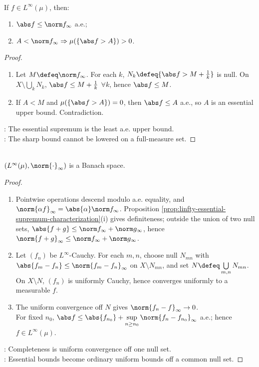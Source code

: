 \begin{proposition} \label{prop:linfty-essential-supremum-characterization} \\
If $f\in L^\infty(\mu)$, then:
\begin{enumerate}[label=(\roman*)]
\setlength{\itemsep}{0pt}
\item $\abs f\leq\norm f_\infty$ a.e.;
\item $A<\norm f_\infty\Rightarrow\mu(\{\abs f>A\})>0$.
\end{enumerate}
\begin{proof}
\begin{enumerate}[label=(\roman*)]
\setlength{\itemsep}{0pt}
\item Let $M\defeq\norm f_\infty$. For each $k$, $N_k\defeq\{\abs f>M+\frac{1}{k}\}$ is null. On $X\setminus\bigcup_kN_k$, $\abs f\leq M+\frac{1}{k}$ $\forall k$, hence $\abs f\leq M$.
\item If $A<M$ and $\mu(\{\abs f>A\})=0$, then $\abs f\leq A$ a.e., so $A$ is an essential upper bound. Contradiction.
\end{enumerate}
: The essential supremum is the least a.e. upper bound.\\
: The sharp bound cannot be lowered on a full-measure set.
\end{proof}
\end{proposition}

\begin{theorem} \label{thm:linfty-banach-space} \\
$(L^\infty(\mu),\norm{\cdot}_\infty)$ is a Banach space.
\begin{proof}
\begin{enumerate}[label=(\roman*)]
\setlength{\itemsep}{0pt}
\item Pointwise operations descend modulo a.e. equality, and $\norm{\alpha f}_\infty=\abs{\alpha}\norm f_\infty$. Proposition \ref{prop:linfty-essential-supremum-characterization}(i) gives definiteness; outside the union of two null sets, $\abs{f+g}\leq\norm f_\infty+\norm g_\infty$, hence $\norm{f+g}_\infty\leq\norm f_\infty+\norm g_\infty$.
\item Let $(f_n)$ be $L^\infty$-Cauchy. For each $m,n$, choose null $N_{mn}$ with $\abs{f_m-f_n}\leq\norm{f_m-f_n}_\infty$ on $X\setminus N_{mn}$, and set $N\defeq\bigcup\limits_{m,n}N_{mn}$. On $X\setminus N$, $(f_n)$ is uniformly Cauchy, hence converges uniformly to a measurable $f$.
\item The uniform convergence off $N$ gives $\norm{f_n-f}_\infty\to0$.\\
For fixed $n_0$, $\abs f\leq\abs{f_{n_0}}+\sup\limits_{n\geq n_0}\norm{f_n-f_{n_0}}_\infty$ a.e.; hence $f\in L^\infty(\mu)$.
\end{enumerate}
: Completeness is uniform convergence off one null set.\\
: Essential bounds become ordinary uniform bounds off a common null set.
\end{proof}
\end{theorem}


